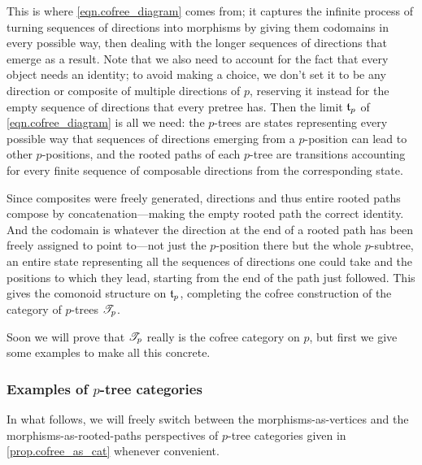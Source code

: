 \documentclass[Book-Poly]{subfiles}
\begin{document}
\begin{example}
This is where \eqref{eqn.cofree_diagram} comes from; it captures the infinite process of turning sequences of directions into morphisms by giving them codomains in every possible way, then dealing with the longer sequences of directions that emerge as a result.
Note that we also need to account for the fact that every object needs an identity; to avoid making a choice, we don't set it to be any direction or composite of multiple directions of $p$, reserving it instead for the empty sequence of directions that every pretree has.
Then the limit $\mathfrak{t}_p$ of \eqref{eqn.cofree_diagram} is all we need: the $p$-trees are states representing every possible way that sequences of directions emerging from a $p$-position can lead to other $p$-positions, and the rooted paths of each $p$-tree are transitions accounting for every finite sequence of composable directions from the corresponding state.

Since composites were freely generated, directions and thus entire rooted paths compose by concatenation---making the empty rooted path the correct identity.
And the codomain is whatever the direction at the end of a rooted path has been freely assigned to point to---not just the $p$-position there but the whole $p$-subtree, an entire state representing all the sequences of directions one could take and the positions to which they lead, starting from the end of the path just followed.
This gives the comonoid structure on $\mathfrak{t}_p$, completing the cofree construction of the category of $p$-trees $\mathscr{T}_{p}$.
\end{example}

Soon we will prove that $\mathscr{T}_{p}$ really is the cofree category on $p$, but first we give some examples to make all this concrete.

\subsubsection{Examples of $p$-tree categories}

In what follows, we will freely switch between the morphisms-as-vertices and the morphisms-as-rooted-paths perspectives of $p$-tree categories given in \cref{prop.cofree_as_cat} whenever convenient.
\end{document}
